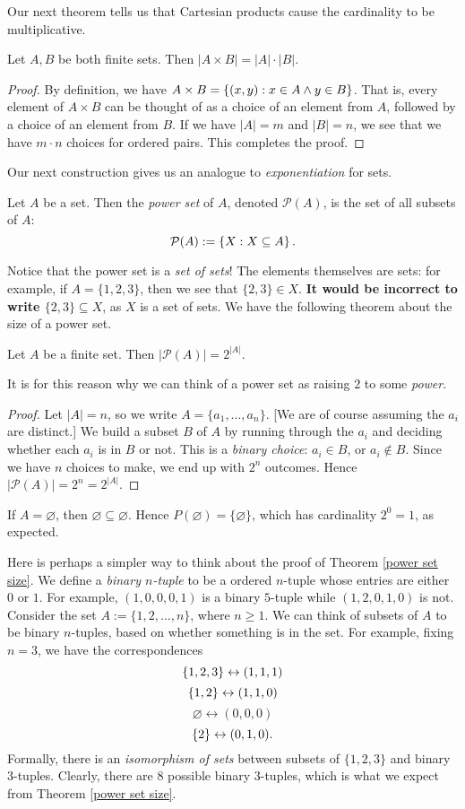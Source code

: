 \documentclass{article}
\begin{document}
Our next theorem tells us that Cartesian products cause the cardinality to be multiplicative.
\begin{theorem}
Let $A, B$ be both finite sets. Then $|A\times B| = |A| \cdot |B|$.
\end{theorem}
\begin{proof}
By definition, we have $A\times B = \left\{(x,y): x\in A \land y\in B\right\}$. That is, every element of $A\times B$ can be thought of as a choice of an element from $A$, followed by a choice of an element from $B$. If we have $|A| = m$ and $|B| = n$, we see that we have $m\cdot n$ choices for ordered pairs. This completes the proof.
\end{proof}

Our next construction gives us an analogue to \textit{exponentiation} for sets.
\begin{definition}
Let $A$ be a set. Then the \textit{power set} of $A$, denoted $\mathcal P(A)$, is the set of all subsets of $A$:
$$\mathcal P(A) := \left\{X: X\subseteq A\right\}.$$
\end{definition}
Notice that the power set is a \textit{set of sets}! The elements themselves are sets: for example, if $A = \{1, 2, 3\}$, then we see that $\{2,3\}\in X$. \textbf{It would be incorrect to write $\{2,3\}\subseteq X$}, as $X$ is a set of sets. We have the following theorem about the size of a power set.

\begin{theorem}\label{power set size}
Let $A$ be a finite set. Then $|\mathcal P(A)| = 2^{|A|}$.
\end{theorem}
It is for this reason why we can think of a power set as raising $2$ to some \textit{power}.
\begin{proof}
Let $|A| = n$, so we write $A = \{a_1, \ldots, a_n\}$. [We are of course assuming the $a_i$ are distinct.] We build a subset $B$ of $A$ by running through the $a_i$ and deciding whether each $a_i$ is in $B$ or not. This is a \textit{binary choice}: $a_i\in B$, or $a_i\not\in B$. Since we have $n$ choices to make, we end up with $2^n$ outcomes. Hence $|\mathcal P(A)| = 2^n = 2^{|A|}$.
\end{proof}
\begin{example}
If $A = \varnothing$, then $\varnothing \subseteq \varnothing$. Hence $P(\varnothing) = \{\varnothing\}$, which has cardinality $2^0 = 1$, as expected.
\end{example}
Here is perhaps a simpler way to think about the proof of Theorem \ref{power set size}. We define a \textit{binary $n$-tuple} to be a ordered $n$-tuple whose entries are either $0$ or $1$. For example, $(1, 0, 0, 0, 1)$ is a binary $5$-tuple while $(1,2,0,1,0)$ is not. Consider the set $A := \{1, 2, \ldots, n\}$, where $n\geq 1$. We can think of subsets of $A$ to be binary $n$-tuples, based on whether something is in the set. For example, fixing $n=3$, we have the correspondences
$$\left\{1,2,3\right\} \leftrightarrow (1, 1, 1)$$
$$\left\{1,2\right\} \leftrightarrow (1,1,0)$$
$$\varnothing \leftrightarrow (0,0,0)$$
$$\left\{2\right\} \leftrightarrow (0,1,0).$$
Formally, there is an \textit{isomorphism of sets} between subsets of $\{1,2,3\}$ and binary $3$-tuples. Clearly, there are $8$ possible binary $3$-tuples, which is what we expect from Theorem \ref{power set size}.
\end{document}
